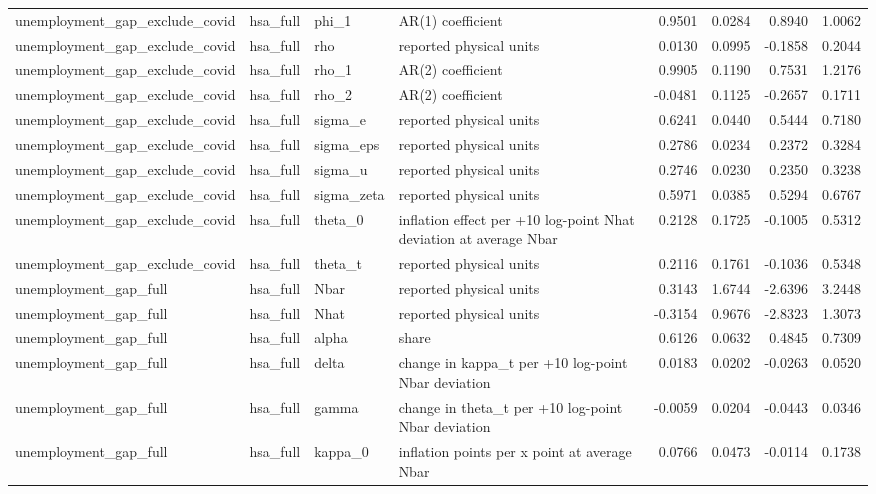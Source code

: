\begin{tabular}{llllrrrr}
unemployment\_gap\_exclude\_covid & hsa\_full & phi\_1 & AR(1) coefficient & 0.9501 & 0.0284 & 0.8940 & 1.0062 \\
unemployment\_gap\_exclude\_covid & hsa\_full & rho & reported physical units & 0.0130 & 0.0995 & -0.1858 & 0.2044 \\
unemployment\_gap\_exclude\_covid & hsa\_full & rho\_1 & AR(2) coefficient & 0.9905 & 0.1190 & 0.7531 & 1.2176 \\
unemployment\_gap\_exclude\_covid & hsa\_full & rho\_2 & AR(2) coefficient & -0.0481 & 0.1125 & -0.2657 & 0.1711 \\
unemployment\_gap\_exclude\_covid & hsa\_full & sigma\_e & reported physical units & 0.6241 & 0.0440 & 0.5444 & 0.7180 \\
unemployment\_gap\_exclude\_covid & hsa\_full & sigma\_eps & reported physical units & 0.2786 & 0.0234 & 0.2372 & 0.3284 \\
unemployment\_gap\_exclude\_covid & hsa\_full & sigma\_u & reported physical units & 0.2746 & 0.0230 & 0.2350 & 0.3238 \\
unemployment\_gap\_exclude\_covid & hsa\_full & sigma\_zeta & reported physical units & 0.5971 & 0.0385 & 0.5294 & 0.6767 \\
unemployment\_gap\_exclude\_covid & hsa\_full & theta\_0 & inflation effect per +10 log-point Nhat deviation at average Nbar & 0.2128 & 0.1725 & -0.1005 & 0.5312 \\
unemployment\_gap\_exclude\_covid & hsa\_full & theta\_t & reported physical units & 0.2116 & 0.1761 & -0.1036 & 0.5348 \\
unemployment\_gap\_full & hsa\_full & Nbar & reported physical units & 0.3143 & 1.6744 & -2.6396 & 3.2448 \\
unemployment\_gap\_full & hsa\_full & Nhat & reported physical units & -0.3154 & 0.9676 & -2.8323 & 1.3073 \\
unemployment\_gap\_full & hsa\_full & alpha & share & 0.6126 & 0.0632 & 0.4845 & 0.7309 \\
unemployment\_gap\_full & hsa\_full & delta & change in kappa\_t per +10 log-point Nbar deviation & 0.0183 & 0.0202 & -0.0263 & 0.0520 \\
unemployment\_gap\_full & hsa\_full & gamma & change in theta\_t per +10 log-point Nbar deviation & -0.0059 & 0.0204 & -0.0443 & 0.0346 \\
unemployment\_gap\_full & hsa\_full & kappa\_0 & inflation points per x point at average Nbar & 0.0766 & 0.0473 & -0.0114 & 0.1738 \\

\end{tabular}

